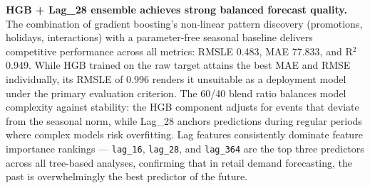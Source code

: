 \begin{notebox}
\textbf{HGB + Lag\_28 ensemble achieves strong balanced forecast quality.} The combination of gradient boosting's non-linear pattern discovery (promotions, holidays, interactions) with a parameter-free seasonal baseline delivers competitive performance across all metrics: RMSLE 0.483, MAE 77.833, and R$^2$ 0.949. While HGB trained on the raw target attains the best MAE and RMSE individually, its RMSLE of 0.996 renders it unsuitable as a deployment model under the primary evaluation criterion. The 60/40 blend ratio balances model complexity against stability: the HGB component adjusts for events that deviate from the seasonal norm, while Lag\_28 anchors predictions during regular periods where complex models risk overfitting. Lag features consistently dominate feature importance rankings — \texttt{lag\_16}, \texttt{lag\_28}, and \texttt{lag\_364} are the top three predictors across all tree-based analyses, confirming that in retail demand forecasting, the past is overwhelmingly the best predictor of the future.
\end{notebox}
